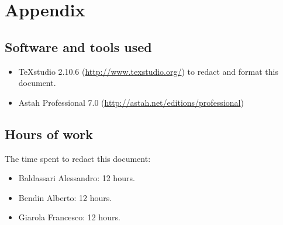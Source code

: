 \documentclass[a4paper,11pt]{report} %
\begin{document}
	\section{Appendix}
		\subsection{Software and tools used}
		\begin{itemize}
			\item TeXstudio 2.10.6 (\href{http://www.texstudio.org/}{http://www.texstudio.org/}) to redact and format this document.
			\item Astah Professional 7.0 (\href{http://astah.net/editions/professional}{http://astah.net/editions/professional}) 
		\end{itemize}
		
		\subsection{Hours of work} The time spent to redact this document:
		\begin{itemize}
			\item Baldassari Alessandro: 12 hours.
			\item Bendin Alberto: 12 hours.
			\item Giarola Francesco: 12 hours.
		\end{itemize}
\end{document}
